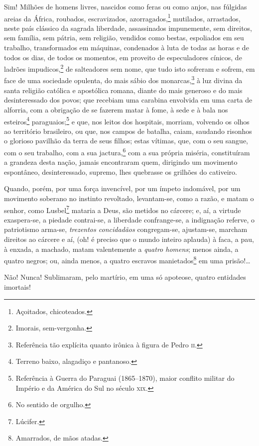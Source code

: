 Sim! Milhões de homens livres, nascidos como feras ou como anjos, nas
fúlgidas areias da África, roubados, escravizados, azorragados,\footnote{
  Açoitados, chicoteados.} mutilados, arrastados, neste país clássico
da sagrada liberdade, assassinados impunemente, sem direitos, sem
família, sem pátria, sem religião, vendidos como bestas, espoliados em
seu trabalho, transformados em máquinas, condenados à luta de todas as
horas e de todos os dias, de todos os momentos, em proveito de
especuladores cínicos, de ladrões impudicos,\footnote{Imorais,
  sem-vergonha.} de salteadores sem nome, que tudo isto sofreram e
sofrem, em face de uma sociedade opulenta, do mais sábio dos
monarcas,\footnote{Referência tão explícita quanto irônica à figura de
  Pedro \textsc{ii}.} à luz divina da santa religião católica e apostólica
romana, diante do mais generoso e do mais desinteressado dos povos; que
recebiam uma carabina envolvida em uma carta de alforria, com a
obrigação de se fazerem matar à fome, à sede e à bala nos
esteiros\footnote{Terreno baixo, alagadiço e pantanoso.}
paraguaios;\footnote{Referência à Guerra do Paraguai (1865--1870), maior
  conflito militar do Império e da América do Sul no século \textsc{xix}.} e
que, nos leitos dos hospitais, morriam, volvendo os olhos ao território
brasileiro, ou que, nos campos de batalha, caiam, saudando risonhos o
glorioso pavilhão da terra de seus filhos; estas vítimas, que, com o seu
sangue, com o seu trabalho, com a sua jactura,\footnote{No sentido de
  orgulho.} com a sua própria miséria, constituíram a grandeza desta
nação, jamais encontraram quem, dirigindo um movimento espontâneo,
desinteressado, supremo, lhes quebrasse os grilhões do cativeiro.

Quando, porém, por uma força invencível, por um ímpeto indomável, por um
movimento soberano no instinto revoltado, levantam-se, como a razão, e
matam o senhor, como Lusbel\footnote{Lúcifer.} mataria a Deus, são
metidos no cárcere; e, aí, a virtude exaspera-se, a piedade contrai-se,
a liberdade confrange-se, a indignação referve, o patriotismo arma-se,
\emph{trezentos concidadãos} congregam-se, ajustam-se, marcham direitos
ao cárcere e aí, (oh! é preciso que o mundo inteiro aplauda) à faca, a
pau, à enxada, a machado, matam valentemente a \emph{quatro homens};
menos ainda, a quatro negros; ou, ainda menos, a quatro escravos
manietados\footnote{Amarrados, de mãos atadas.} em uma prisão!\ldots{}

Não! Nunca! Sublimaram, pelo martírio, em uma só apoteose, quatro
entidades imortais!

